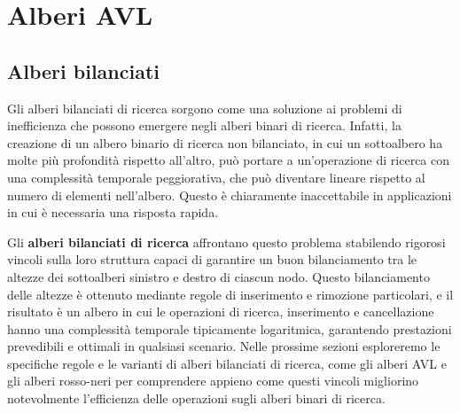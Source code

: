 \begin{center}
\begin{minipage}{.45\textwidth}
\begin{tikzpicture}
\end{tikzpicture}
\label{fig:delete-abr-3-min-detach}
\end{minipage}
\begin{minipage}{.45\textwidth}
\centering
{}
\label{fig:delete-abr-3-result}
\end{minipage}
\end{center}

\section{Alberi AVL}
\subsection{Alberi bilanciati}
Gli alberi bilanciati di ricerca sorgono come una soluzione ai problemi di inefficienza che possono emergere negli alberi binari di ricerca. Infatti, la creazione di un albero binario di ricerca non bilanciato, in cui un sottoalbero ha molte più profondità rispetto all'altro, può portare a un'operazione di ricerca con una complessità temporale peggiorativa, che può diventare lineare rispetto al numero di elementi nell'albero. Questo è chiaramente inaccettabile in applicazioni in cui è necessaria una risposta rapida.

Gli \textbf{alberi bilanciati di ricerca} affrontano questo problema stabilendo rigorosi vincoli sulla loro struttura capaci di garantire un buon bilanciamento tra le altezze dei sottoalberi sinistro e destro di ciascun nodo. Questo bilanciamento delle altezze è ottenuto mediante regole di inserimento e rimozione particolari, e il risultato è un albero in cui le operazioni di ricerca, inserimento e cancellazione hanno una complessità temporale tipicamente logaritmica, garantendo prestazioni prevedibili e ottimali in qualsiasi scenario. Nelle prossime sezioni esploreremo le specifiche regole e le varianti di alberi bilanciati di ricerca, come gli alberi AVL e gli alberi rosso-neri per comprendere appieno come questi vincoli migliorino notevolmente l'efficienza delle operazioni sugli alberi binari di ricerca.

